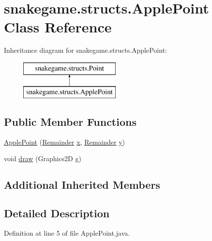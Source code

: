 \hypertarget{classsnakegame_1_1structs_1_1_apple_point}{}\section{snakegame.\+structs.\+Apple\+Point Class Reference}
\label{classsnakegame_1_1structs_1_1_apple_point}
Inheritance diagram for snakegame.\+structs.\+Apple\+Point\+:\begin{figure}[H]
\begin{center}
\leavevmode
\includegraphics[height=2.000000cm]{classsnakegame_1_1structs_1_1_apple_point}
\end{center}
\end{figure}
\subsection*{Public Member Functions}
\begin{DoxyCompactItemize}
\item 
\mbox{\hyperlink{classsnakegame_1_1structs_1_1_apple_point_a4d23b0796de73346c556ee8e10bcf080}{Apple\+Point}} (\mbox{\hyperlink{classsnakegame_1_1structs_1_1_remainder}{Remainder}} \mbox{\hyperlink{classsnakegame_1_1structs_1_1_point_acf6c91ee7cda0e65a8054ff0dc07b79a}{x}}, \mbox{\hyperlink{classsnakegame_1_1structs_1_1_remainder}{Remainder}} \mbox{\hyperlink{classsnakegame_1_1structs_1_1_point_a2a9fe55d9cf57dbc120bbce39313d38d}{y}})
\item 
void \mbox{\hyperlink{classsnakegame_1_1structs_1_1_apple_point_a0202e1a32a56ad9778cea65a604282c6}{draw}} (Graphics2D g)
\end{DoxyCompactItemize}
\subsection*{Additional Inherited Members}


\subsection{Detailed Description}


Definition at line 5 of file Apple\+Point.\+java.



